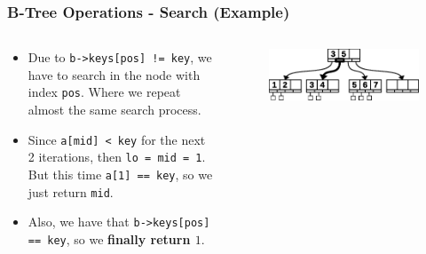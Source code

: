 \documentclass{beamer}
\begin{document}
\begin{frame}
    \frametitle{B-Tree Operations - Search (Example)}
    \begin{columns}
        \begin{column}{.45\textwidth}
            \vspace{-1cm}
            \begin{block}{}
                \begin{itemize}
                    \item Due to \lstinline|b->keys[pos] != key|, we have to search in the node with index \lstinline|pos|. Where we repeat almost the same search process.
                    \item Since \lstinline|a[mid] < key| for the next 2 iterations, then \lstinline|lo = mid = 1|. But this time \lstinline|a[1] == key|, so we just return \lstinline|mid|.
                    \item Also, we have that \lstinline|b->keys[pos] == key|, so we \textbf{finally return \(1\)}.
                \end{itemize}
            \end{block}
        \end{column}
        \begin{column}{.6\textwidth}
            \vspace{-1cm}
            \begin{block}{}
                \begin{figure}[h!]
                    \includegraphics[width=\linewidth]{resources/made/a4_b_tree_searchstep2.eps}
                \end{figure}    
                \btreeSearchStepTwo
            \end{block}
        \end{column}
    \end{columns}
\end{frame}
\end{document}
